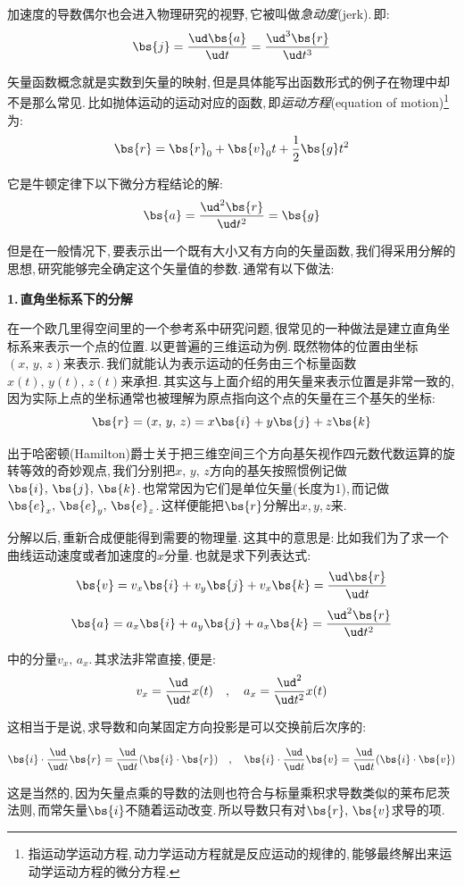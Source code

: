 加速度的导数偶尔也会进入物理研究的视野,\,它被叫做\emph{急动度}(jerk).\,即:
\[\bs{j}=\frac{\ud \bs{a}}{\ud t}=\frac{\ud ^3\bs{r}}{\ud t^3}\]

矢量函数概念就是实数到矢量的映射,\,但是具体能写出函数形式的例子在物理中却不是那么常见.\,比如抛体运动的运动对应的函数,\,即\emph{运动方程}(equation of motion)\footnote{指运动学运动方程,\,动力学运动方程就是反应运动的规律的,\,能够最终解出来运动学运动方程的微分方程.}为:
\[\bs{r}=\bs{r}_0+\bs{v}_0 t+\frac{1}{2}\bs{g}t^2\]

它是牛顿定律下以下微分方程结论的解:
\[\bs{a}=\frac{\ud ^2\bs{r}}{\ud t^2}=\bs{g}\]

但是在一般情况下,\,要表示出一个既有大小又有方向的矢量函数,\,我们得采用分解的思想,\,研究能够完全确定这个矢量值的参数.\,通常有以下做法:

\vspace{0.2cm}
{\bf 1.\,直角坐标系下的分解}

在一个欧几里得空间里的一个参考系中研究问题,\,很常见的一种做法是建立直角坐标系来表示一个点的位置.\,以更普遍的三维运动为例.\,既然物体的位置由坐标$(x,\,y,\,z)$来表示.\,我们就能认为表示运动的任务由三个标量函数$x(t),\,y(t),\,z(t)$来承担.\,其实这与上面介绍的用矢量来表示位置是非常一致的,\,因为实际上点的坐标通常也被理解为原点指向这个点的矢量在三个基矢的坐标:
\[\bs{r}=(x,\,y,\,z)=x\bs{i}+y\bs{j}+z\bs{k}\]

出于哈密顿(Hamilton)爵士关于把三维空间三个方向基矢视作四元数代数运算的旋转等效的奇妙观点,\,我们分别把$x,\,y,\,z$方向的基矢按照惯例记做$\bs{i},\,\bs{j},\,\bs{k}$.\,也常常因为它们是单位矢量(长度为1),\,而记做$\bs{e}_x,\,\bs{e}_y,\,\bs{e}_z$.\,这样便能把$\bs{r}$分解出$x$,\,$y$,\,$z$来.

分解以后,\,重新合成便能得到需要的物理量.\,这其中的意思是:\,比如我们为了求一个曲线运动速度或者加速度的$x$分量.\,也就是求下列表达式:
\[\bs{v}=v_x\bs{i}+v_y\bs{j}+v_x\bs{k}=\frac{\ud \bs{r}}{\ud t}\]
\[\bs{a}=a_x\bs{i}+a_y\bs{j}+a_x\bs{k}=\frac{\ud^2 \bs{r}}{\ud t^2}\]

中的分量$v_x,\,a_x$.\,其求法非常直接,\,便是:
\[v_x=\frac{\ud }{\ud t}x(t)\quad,\quad a_x=\frac{\ud^2 }{\ud t^2}x(t)\]

这相当于是说,\,求导数和向某固定方向投影是可以交换前后次序的:

\[\bs{i}\cdot \frac{\ud }{\ud t}\bs{r}=\frac{\ud }{\ud t}(\bs{i}\cdot \bs{r})\quad,\quad \bs{i}\cdot \frac{\ud }{\ud t}\bs{v}=\frac{\ud }{\ud t}(\bs{i}\cdot \bs{v})\]

这是当然的,\,因为矢量点乘的导数的法则也符合与标量乘积求导数类似的莱布尼茨法则,\,而常矢量$\bs{i}$不随着运动改变.\,所以导数只有对$\bs{r},\,\bs{v}$求导的项.

